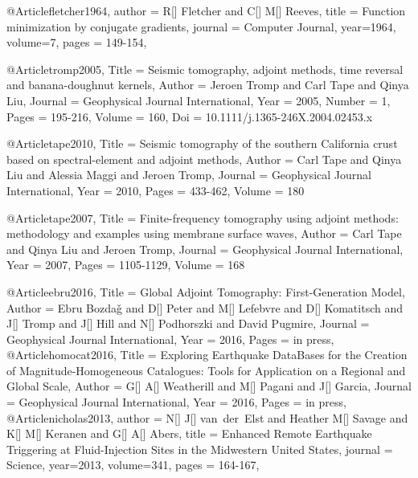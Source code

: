 @Article{fletcher1964,
  author =	 {R[] Fletcher and C[] M[] Reeves},
  title =	 {Function minimization by conjugate gradients},
  journal =	 {Computer Journal},
  year=1964,
  volume=7,
  pages =	 {149-154},
}

@Article{tromp2005,
  Title                    = {Seismic tomography, adjoint methods, time reversal and banana-doughnut kernels},
  Author                   = {Jeroen Tromp and Carl Tape and Qinya Liu},
  Journal                  = {Geophysical Journal International},
  Year                     = {2005},
  Number                   = {1},
  Pages                    = {195-216},
  Volume                   = {160},
  Doi                      = {10.1111/j.1365-246X.2004.02453.x}
}

@Article{tape2010,
  Title                    = {Seismic tomography of the southern {C}alifornia crust based on spectral-element and adjoint methods},
  Author                   = {Carl Tape and Qinya Liu and Alessia Maggi and Jeroen Tromp},
  Journal                  = Geophysical Journal International,
  Year                     = {2010},
  Pages                    = {433-462},
  Volume                   = {180}
}

@Article{tape2007,
  Title                    = {Finite-frequency tomography using adjoint methods: methodology and examples using membrane surface waves},
  Author                   = {Carl Tape and Qinya Liu and Jeroen Tromp},
  Journal                  = Geophysical Journal International,
  Year                     = {2007},
  Pages                    = {1105-1129},
  Volume                   = {168}
}

@Article{ebru2016,
  Title                    = {Global Adjoint Tomography: First-Generation Model},
  Author                   = {Ebru Bozda\v{g} and D[] Peter and M[] Lefebvre and D[] Komatitsch and J[] Tromp and J[] Hill and N[] Podhorszki and David Pugmire},
  Journal                  = Geophysical Journal International,
  Year                     = {2016},
  Pages                    = {in press},
}
@Article{homocat2016,
  Title                    = {Exploring Earthquake DataBases for the Creation of Magnitude-Homogeneous Catalogues: Tools for Application on a Regional and Global Scale},
  Author                   = {G[] A[] Weatherill and M[] Pagani and J[] Garcia},
  Journal                  = {Geophysical Journal International},
  Year                     = {2016},
  Pages                    = {in press},
}
@Article{nicholas2013,
  author =	 {N[] J[] van~der~Elst and Heather M[] Savage and K[] M[] Keranen and G[] A[] Abers},
  title =	 {Enhanced Remote Earthquake Triggering at Fluid-Injection Sites in the Midwestern United States},
  journal =	 {Science},
  year=2013,
  volume=341,
  pages =	 {164-167},
}

